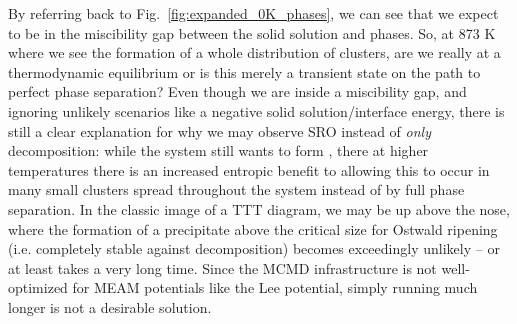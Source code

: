 By referring back to Fig.~\ref{fig:expanded_0K_phases}, we can see that we expect to be in the miscibility gap between the solid solution and \DOTHREE phases.
So, at 873 K where we see the formation of a whole distribution of clusters, are we really at a thermodynamic equilibrium or is this merely a transient state on the path to perfect phase separation?
Even though we are inside a miscibility gap, and ignoring unlikely scenarios like a negative solid solution/\DOTHREE interface energy, there is still a clear explanation for why we may observe SRO instead of \emph{only} decomposition: while the system still wants to form \DOTHREE, there at higher temperatures there is an increased entropic benefit to allowing this \DOTHREE to occur in many small clusters spread throughout the system instead of by full phase separation.
In the classic image of a TTT diagram, we may be up above the nose, where the formation of a precipitate above the critical size for Ostwald ripening (i.e. completely stable against decomposition) becomes exceedingly unlikely -- or at least takes a very long time.
Since the MCMD infrastructure is not well-optimized for MEAM potentials like the Lee potential, simply running much longer is not a desirable solution.

